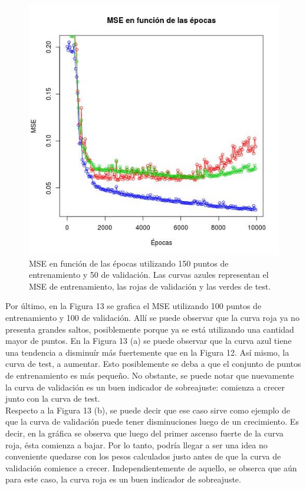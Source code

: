 \documentclass[12pt, a4paper]{article}
\begin{document}
\begin{figure}
    \centering
	\includegraphics[scale=0.45]{mse2e}
	\caption{MSE en función de las épocas utilizando 150 puntos de entrenamiento y 50 de validación. Las curvas azules representan el MSE de entrenamiento, las rojas de validación y las verdes de test.}
\end{figure} 


\bigskip

Por último, en la Figura 13 se grafica el MSE utilizando 100 puntos de entrenamiento y 100 de validación. Allí se puede observar que la curva roja ya no presenta grandes saltos, posiblemente porque ya se está utilizando una cantidad mayor de puntos. En la Figura 13 (a) se puede observar que la curva azul tiene una tendencia a disminuír más fuertemente que en la Figura 12. Así mismo, la curva de test, a aumentar. Esto posiblemente se deba a que el conjunto de puntos de entrenamiento es más pequeño. No obstante, se puede notar que nuevamente la curva de validación es un buen indicador de sobreajuste: comienza a crecer junto con la curva de test.\\
Respecto a la Figura 13 (b), se puede decir que ese caso sirve como ejemplo de que la curva de validación puede tener disminuciones luego de un crecimiento. Es decir, en la gráfica se observa que luego del primer ascenso fuerte de la curva roja, ésta comienza a bajar. Por lo tanto, podría llegar a ser una idea no conveniente quedarse con los pesos calculados justo antes de que la curva de validación comience a crecer. Independientemente de aquello, se obserca que aún para este caso, la curva roja es un buen indicador de sobreajuste.
\end{document}
